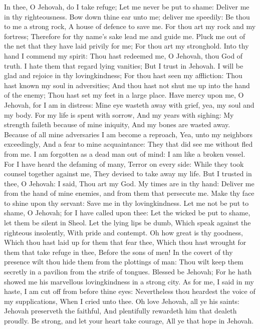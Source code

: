In thee, O Jehovah, do I take refuge; Let me never be put to shame: Deliver me in thy righteousness.  Bow down thine ear unto me; deliver me speedily: Be thou to me a strong rock, A house of defence to save me.  For thou art my rock and my fortress; Therefore for thy name’s sake lead me and guide me.  Pluck me out of the net that they have laid privily for me; For thou art my stronghold.  Into thy hand I commend my spirit: Thou hast redeemed me, O Jehovah, thou God of truth.  I hate them that regard lying vanities; But I trust in Jehovah.  I will be glad and rejoice in thy lovingkindness; For thou hast seen my affliction: Thou hast known my soul in adversities;  And thou hast not shut me up into the hand of the enemy; Thou hast set my feet in a large place.  Have mercy upon me, O Jehovah, for I am in distress: Mine eye wasteth away with grief, yea, my soul and my body.  For my life is spent with sorrow, And my years with sighing: My strength faileth because of mine iniquity, And my bones are wasted away.  Because of all mine adversaries I am become a reproach, Yea, unto my neighbors exceedingly, And a fear to mine acquaintance: They that did see me without fled from me.  I am forgotten as a dead man out of mind: I am like a broken vessel.  For I have heard the defaming of many, Terror on every side: While they took counsel together against me, They devised to take away my life.  But I trusted in thee, O Jehovah: I said, Thou art my God.  My times are in thy hand: Deliver me from the hand of mine enemies, and from them that persecute me.  Make thy face to shine upon thy servant: Save me in thy lovingkindness.  Let me not be put to shame, O Jehovah; for I have called upon thee: Let the wicked be put to shame, let them be silent in Sheol.  Let the lying lips be dumb, Which speak against the righteous insolently, With pride and contempt.  Oh how great is thy goodness, Which thou hast laid up for them that fear thee, Which thou hast wrought for them that take refuge in thee, Before the sons of men!  In the covert of thy presence wilt thou hide them from the plottings of man: Thou wilt keep them secretly in a pavilion from the strife of tongues.  Blessed be Jehovah; For he hath showed me his marvellous lovingkindness in a strong city.  As for me, I said in my haste, I am cut off from before thine eyes: Nevertheless thou heardest the voice of my supplications, When I cried unto thee.  Oh love Jehovah, all ye his saints: Jehovah preserveth the faithful, And plentifully rewardeth him that dealeth proudly.  Be strong, and let your heart take courage, All ye that hope in Jehovah. 

